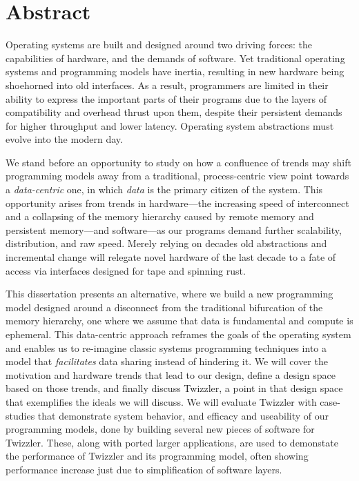 \begingroup
\let\clearpage\relax
\let\cleardoublepage\relax
\let\cleardoublepage\relax

\chapter*{Abstract}

Operating systems are built and designed around two driving forces: the capabilities of hardware, and the demands of
software. Yet traditional operating systems and programming models have inertia, resulting
in new hardware being shoehorned into old interfaces. As a result, programmers are limited in their ability to express
the important parts of their programs due to the layers of compatibility and overhead thrust upon them, despite their
persistent demands for higher throughput and lower latency. Operating system abstractions must evolve into the modern day.

We stand before an opportunity to study on how a confluence of trends may shift programming models away from a
traditional, process-centric view point towards a \emph{data-centric} one, in which \emph{data} is the primary citizen
of the system. This opportunity arises from trends in hardware---the increasing speed of interconnect and a collapsing of
the memory hierarchy caused by remote memory and persistent memory---and software---as our programs demand further
scalability, distribution, and raw speed. Merely relying on decades old abstractions and incremental change will
relegate novel hardware of the last decade to a fate of access via interfaces designed for tape and spinning rust.

This dissertation presents an alternative, where we build a new programming model designed around a disconnect from the
traditional bifurcation of the memory hierarchy, one where we assume that data is fundamental and compute is ephemeral.
This data-centric approach reframes the goals of the operating system and enables us to re-imagine classic systems
programming techniques into a model that \emph{facilitates} data sharing instead of hindering it. We will cover the motivation and hardware trends
that lead to our design, define a design space based on those trends, and finally discuss Twizzler, a point in that
design space that exemplifies the ideals we will discuss. We will evaluate Twizzler with case-studies that demonstrate
system behavior, and efficacy and useability of our programming models, done by building several new pieces of software
for Twizzler. These, along with ported larger applications, are used to demonstate the performance of Twizzler and its
programming model, often showing performance increase just due to simplification of software layers.

\vfill


\endgroup

\vfill
